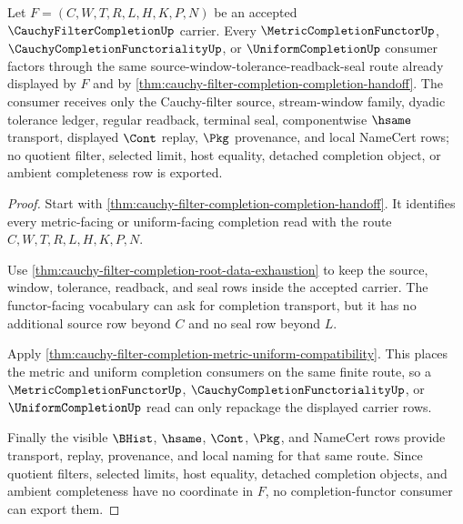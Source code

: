 


\begin{theorem}
\label{thm:cauchy-filter-completion-completion-functor-factorization}
Let $F=(C,W,T,R,L,H,K,P,N)$ be an accepted $\CauchyFilterCompletionUp$ carrier. Every $\MetricCompletionFunctorUp$, $\CauchyCompletionFunctorialityUp$, or $\UniformCompletionUp$ consumer factors through the same source-window-tolerance-readback-seal route already displayed by $F$ and by \autoref{thm:cauchy-filter-completion-completion-handoff}. The consumer receives only the Cauchy-filter source, stream-window family, dyadic tolerance ledger, regular readback, terminal seal, componentwise $\hsame$ transport, displayed $\Cont$ replay, $\Pkg$ provenance, and local NameCert rows; no quotient filter, selected limit, host equality, detached completion object, or ambient completeness row is exported.
\end{theorem}
\begin{proof}
Start with \autoref{thm:cauchy-filter-completion-completion-handoff}. It identifies every metric-facing or uniform-facing completion read with the route $C,W,T,R,L,H,K,P,N$.

Use \autoref{thm:cauchy-filter-completion-root-data-exhaustion} to keep the source, window, tolerance, readback, and seal rows inside the accepted carrier. The functor-facing vocabulary can ask for completion transport, but it has no additional source row beyond $C$ and no seal row beyond $L$.

Apply \autoref{thm:cauchy-filter-completion-metric-uniform-compatibility}. This places the metric and uniform completion consumers on the same finite route, so a $\MetricCompletionFunctorUp$, $\CauchyCompletionFunctorialityUp$, or $\UniformCompletionUp$ read can only repackage the displayed carrier rows.

Finally the visible $\BHist$, $\hsame$, $\Cont$, $\Pkg$, and NameCert rows provide transport, replay, provenance, and local naming for that same route. Since quotient filters, selected limits, host equality, detached completion objects, and ambient completeness have no coordinate in $F$, no completion-functor consumer can export them.
\end{proof}

